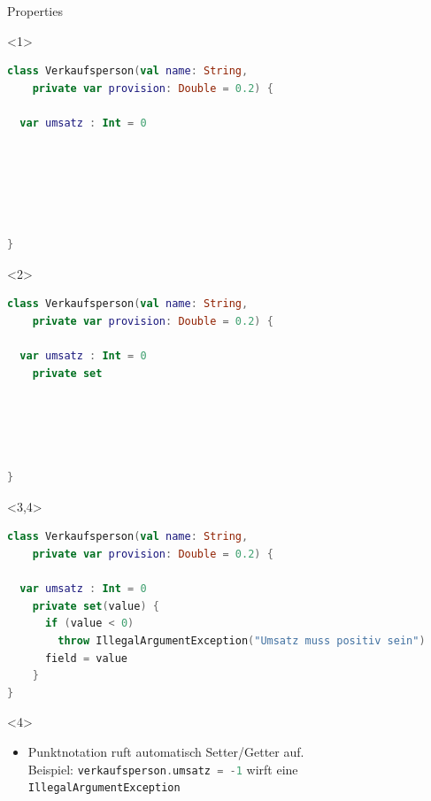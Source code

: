 \documentclass{beamer}
\begin{document}
\begin{frame}[fragile]{Properties}
  \begin{onlyenv}<1>
    \begin{lstlisting}[language=Kotlin, title=Kotlin: Properties, xleftmargin=1em]
class Verkaufsperson(val name: String, 
    private var provision: Double = 0.2) {
            
  var umsatz : Int = 0



      
      
      
}
    \end{lstlisting}
  \end{onlyenv}
  \begin{onlyenv}<2>
    \begin{lstlisting}[language=Kotlin, title=Kotlin: Properties Zugriffsmodifikator, xleftmargin=1em]
class Verkaufsperson(val name: String, 
    private var provision: Double = 0.2) {
      
  var umsatz : Int = 0
    private set





}
    \end{lstlisting}
  \end{onlyenv}
  \begin{onlyenv}<3,4>
    \begin{lstlisting}[language=Kotlin, title=Kotlin: Benutzerdefinierte Zugriffsmethoden, xleftmargin=1em]
class Verkaufsperson(val name: String, 
    private var provision: Double = 0.2) {

  var umsatz : Int = 0
    private set(value) {
      if (value < 0)
        throw IllegalArgumentException("Umsatz muss positiv sein")
      field = value
    }
}
    \end{lstlisting}
  \end{onlyenv}
  \begin{uncoverenv}<4>
    \begin{itemize}
    \item Punktnotation ruft automatisch Setter/Getter auf. \\
    \hspace{0.25cm} Beispiel: \lstinline[language=kotlin]|verkaufsperson.umsatz = -1| wirft eine \\
    \hspace{0.25cm} \texttt{IllegalArgumentException}
    \end{itemize}
  \end{uncoverenv}
\end{frame}
\end{document}
